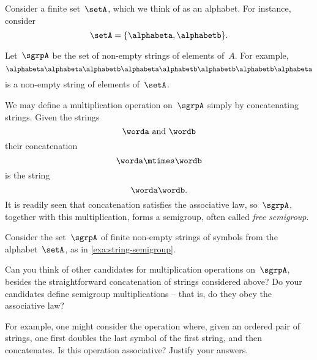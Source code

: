 \begin{example}
    \label{string-sgrp}
    \label{exa:string-semigroup}
    Consider a finite set~$\setA$, which we think of as an alphabet. For instance, consider
    \begin{equation}
        \label{eq:string-semigroup-alphabet}
        \setA = \{ \alphabeta, \alphabetb \}.
    \end{equation}

    Let~$\sgrpA$ be the set of non-empty strings of elements of~$A$. For example,
    \begin{equation}
        \label{eq:string-semigroup-word}
        \alphabeta\alphabeta \alphabetb \alphabeta \alphabetb \alphabetb \alphabetb \alphabeta
    \end{equation}
    is a non-empty string of elements of~$\setA$.

    We may define a multiplication operation on~$\sgrpA$ simply by concatenating strings. Given the strings
    \begin{equation*}
        \worda \text{ and } \wordb
    \end{equation*}
    their concatenation
    \begin{equation*}
        \label{eq:string-semigroup-wordab}
        \worda \mtimes  \wordb
    \end{equation*}
    is the string
    \begin{equation*}
        \label{eq:string-semigroup-wordab-concat}
        \worda \wordb.
    \end{equation*}
    It is readily seen that concatenation satisfies the associative law, so~$\sgrpA$, together with this multiplication, forms a semigroup, often called \emph{free semigroup}.
\end{example}
\showslides{
    \begin{forslides}
        \begin{equation}
            \label{eq:string-semigroup-empty-string}
            \alphabeta\alphabeta \alphabetb \mtimes \tup{} =  \alphabeta\alphabeta \alphabetb
        \end{equation}
    \end{forslides}
}


\begin{gradedexercise}
    \label{ex:VariationsOnConcatenation}
    \label{ex:alphabet}
    Consider the set~$\sgrpA$ of finite non-empty strings of symbols from the alphabet~$\setA$, as in \cref{exa:string-semigroup}.


    Can you think of other candidates for multiplication operations on~$\sgrpA$, besides the straightforward concatenation of strings considered above?
    Do your candidates define semigroup multiplications -- that is, do they obey the associative law?


    For example, one might consider the operation where, given an ordered pair of strings, one first doubles the last symbol of the first string, and then concatenates.
    Is this operation associative? Justify your answers.
\end{gradedexercise}



